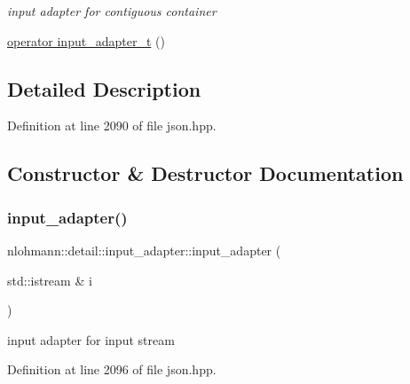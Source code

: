\begin{DoxyCompactItemize}
\begin{DoxyCompactList}\small\item\em input adapter for contiguous container \end{DoxyCompactList}\item 
\hyperlink{classnlohmann_1_1detail_1_1input__adapter_a4ef04b9490247fc38f3d1c2a9e18789b}{operator input\+\_\+adapter\+\_\+t} ()
\end{DoxyCompactItemize}


\subsection{Detailed Description}


Definition at line 2090 of file json.\+hpp.



\subsection{Constructor \& Destructor Documentation}
\mbox{\label{classnlohmann_1_1detail_1_1input__adapter_ae89f11268d4724b3080473f7218abe86}} 
\subsubsection{\texorpdfstring{input\+\_\+adapter()}{input\_adapter()}\hspace{0.1cm}{\footnotesize\ttfamily [1/10]}}
{\footnotesize\ttfamily nlohmann\+::detail\+::input\+\_\+adapter\+::input\+\_\+adapter (\begin{DoxyParamCaption}\item[{std\+::istream \&}]{i }\end{DoxyParamCaption})\hspace{0.3cm}{\ttfamily [inline]}}



input adapter for input stream 



Definition at line 2096 of file json.\+hpp.

\mbox{\label{classnlohmann_1_1detail_1_1input__adapter_af002dd2e53ac0855a03cb68d0ce626b2}} 
